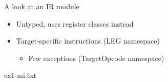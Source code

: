 
\begin{frame}{A look at an IR module}

\begin{itemize}
    \item Untyped, uses register classes instead
    \item Target-specific instructions (LEG namespace)
    \begin{itemize}
        \item Few exceptions (TargetOpcode namespace)
    \end{itemize}
\end{itemize}

\begin{block}{ex1-mi.txt}

\end{block}

\end{frame}
